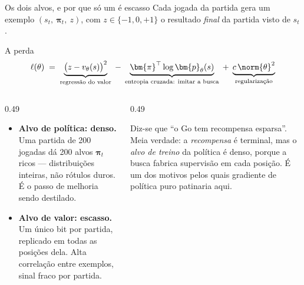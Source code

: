 \documentclass[aspectratio=169, 10pt]{beamer}
\newcommand{\redeval}{v_{\theta}}
\newcommand{\redepol}{\bm{p}_{\theta}}
\newcommand{\raizpol}{\bm{\pi}}
\begin{document}
\begin{frame}{Os dois alvos, e por que só um é escasso}
  \small
  Cada jogada da partida gera um exemplo $(s_t,\ \raizpol_t,\ z)$, com $z \in \{-1,0,+1\}$
  o resultado \emph{final} da partida visto de $s_t$.

  \begin{teobox}{A perda}
    \[
      \ell(\theta) \;=\;
      \underbrace{\bigl(z - \redeval(s)\bigr)^{2}}_{\text{regressão do valor}}
      \;-\; \underbrace{\raizpol^{\top} \log \redepol(s)}_{\text{entropia cruzada: imitar a busca}}
      \;+\; \underbrace{c\,\norm{\theta}^{2}}_{\text{regularização}}
    \]
  \end{teobox}

  \begin{columns}[T]
    \begin{column}{0.49\textwidth}
      \begin{itemize}
        \item \textbf{Alvo de política: denso.} Uma partida de 200 jogadas dá 200
              alvos $\raizpol_t$ ricos — distribuições inteiras, não rótulos
              duros. É o passo de melhoria sendo destilado.
        \item \textbf{Alvo de valor: escasso.} Um único bit por partida, replicado
              em todas as posições dela. Alta correlação entre exemplos, sinal
              fraco por partida.
      \end{itemize}
    \end{column}
    \begin{column}{0.49\textwidth}
      \begin{alertabox}
        Diz-se que ``o Go tem recompensa esparsa''. Meia verdade: a
        \emph{recompensa} é terminal, mas o \emph{alvo de treino} da política é
        denso, porque a busca fabrica supervisão em cada posição. É um dos motivos
        pelos quais gradiente de política puro patinaria aqui.
      \end{alertabox}
    \end{column}
  \end{columns}
\end{frame}
\end{document}

